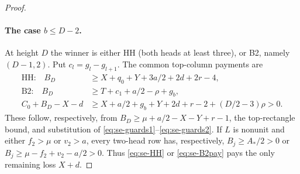 \documentclass[11pt,a4paper]{article}
\theoremstyle{definition}
\begin{document}
\begin{proof}
\paragraph{The case $b\le D-2$.}
At height $D$ the winner is either HH (both heads at least three), or B2, namely $(D-1,2)$. Put $c_l=g_l-g_{l+1}$. The common top-column payments are
\begin{align}
\text{HH:}\quad B_D&\ge X+q_0+Y+3a/2+2d+2r-4,\label{eq:se-HH}\\
\text{B2:}\quad B_D&\ge T+c_1+a/2-\rho+g_b,\label{eq:se-B2}\\
C_0+B_D-X-d&\ge X+a/2+g_b+Y+2d+r-2+(D/2-3)\rho>0.\label{eq:se-B2pay}
\end{align}
These follow, respectively, from $B_D\ge\mu+a/2-X-Y+r-1$, the top-rectangle bound, and substitution of \eqref{eq:se-guards1}--\eqref{eq:se-guards2}. If $L$ is nonunit and either $f_2>\mu$ or $v_2>a$, every two-head row has, respectively, $B_j\ge A_*/2>0$ or $B_j\ge\mu-f_2+v_2-a/2>0$. Thus \eqref{eq:se-HH} or \eqref{eq:se-B2pay} pays the only remaining loss $X+d$.


\end{proof}
\end{document}
